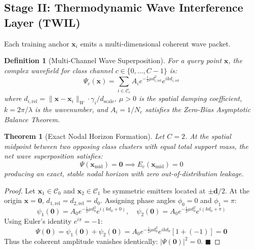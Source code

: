\documentclass[journal,twoside]{IEEEtran}
\newtheorem{theorem}{Theorem}
\newtheorem{definition}{Definition}
\theoremstyle{remark}
\begin{document}
\subsection{Stage II: Thermodynamic Wave Interference Layer (TWIL)}
Each training anchor $\mathbf{x}_i$ emits a multi-dimensional coherent wave packet.

\begin{definition}[Multi-Channel Wave Superposition]
For a query point $\mathbf{x}$, the complex wavefield for class channel $c \in \{0, \dots, C-1\}$ is:
\begin{equation}
    \Psi_c(\mathbf{x}) = \sum_{i \in \mathcal{C}_c} A_i e^{-\frac{1}{2} \mu d_{i, \text{rel}}^2} e^{i k d_{i, \text{rel}}}
\end{equation}
where $d_{i, \text{rel}} = \|\mathbf{x} - \mathbf{x}_i\|_W \cdot \gamma_i / d_{\text{scale}}$, $\mu > 0$ is the spatial damping coefficient, $k = 2\pi / \lambda$ is the wavenumber, and $A_i = 1 / N_c$ satisfies the Zero-Bias Asymptotic Balance Theorem.
\end{definition}

\begin{theorem}[Exact Nodal Horizon Formation]
Let $C=2$. At the spatial midpoint between two opposing class clusters with equal total support mass, the net wave superposition satisfies:
\begin{equation}
    \Psi(\mathbf{x}_{\text{mid}}) = \mathbf{0} \implies E_c(\mathbf{x}_{\text{mid}}) = 0
\end{equation}
producing an exact, stable nodal horizon with zero out-of-distribution leakage.
\end{theorem}

\begin{proof}
Let $\mathbf{x}_1 \in \mathcal{C}_0$ and $\mathbf{x}_2 \in \mathcal{C}_1$ be symmetric emitters located at $\pm \mathbf{d}/2$. At the origin $\mathbf{x} = \mathbf{0}$, $d_{1, \text{rel}} = d_{2, \text{rel}} = d_0$.
Assigning phase angles $\phi_0 = 0$ and $\phi_1 = \pi$:
\begin{equation*}
    \psi_1(\mathbf{0}) = A_0 e^{-\frac{1}{2} \mu d_0^2} e^{i (k d_0 + 0)}, \quad \psi_2(\mathbf{0}) = A_0 e^{-\frac{1}{2} \mu d_0^2} e^{i (k d_0 + \pi)}
\end{equation*}
Using Euler's identity $e^{i\pi} = -1$:
\begin{equation*}
    \Psi(\mathbf{0}) = \psi_1(\mathbf{0}) + \psi_2(\mathbf{0}) = A_0 e^{-\frac{1}{2}\mu d_0^2} e^{ik d_0} \left[ 1 + (-1) \right] = \mathbf{0}
\end{equation*}
Thus the coherent amplitude vanishes identically: $|\Psi(\mathbf{0})|^2 = 0$. $\blacksquare$
\end{proof}
\end{document}
